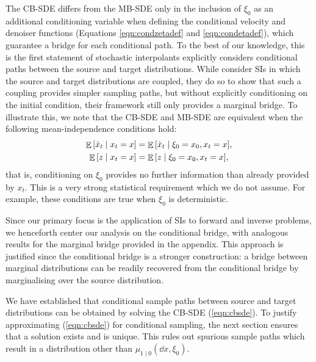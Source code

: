 The CB-SDE differs from the MB-SDE only in the inclusion of \(\xi_{0}\) as an additional conditioning variable when defining the conditional velocity and denoiser functions (Equations \ref{eqn:condzetadef} and \ref{eqn:condetadef}), which guarantee a bridge for each conditional path. To the best of our knowledge, this is the first statement of stochastic interpolants explicitly considers conditional paths between the source and target distributions. While \citet{albergo2023stochastic} consider SIs in which the source and target distributions are coupled, they do so to show that such a coupling provides simpler sampling paths, but without explicitly conditioning on the initial condition, their framework still only provides a marginal bridge. To illustrate this, we note that the CB-SDE and MB-SDE are equivalent when the following mean-independence conditions hold:
\begin{align*}
  \mathop{\mathbb{E}}\qty[\dot{x}_{t} \mid x_{t} = x] &= \mathop{\mathbb{E}}\qty[\dot{x}_{t} \mid \xi_{0} = x_{0}, x_{t} = x], \\
  \mathop{\mathbb{E}}\qty[z \mid x_{t} = x] &= \mathop{\mathbb{E}}\qty[z \mid \xi_{0} = x_{0}, x_{t} = x],
\end{align*}
that is, conditioning on \(\xi_{0}\) provides no further information than already provided by \(x_{t}\). This is a very strong statistical requirement which we do not assume. For example, these conditions are true when \(\xi_{0}\) is deterministic. %

Since our primary focus is the application of SIs to forward and inverse problems, we henceforth center our analysis on the conditional bridge, with analogous results for the marginal bridge provided in the appendix. This approach is justified since the conditional bridge is a stronger construction: a bridge between marginal distributions can be readily recovered from the conditional bridge by marginalising over the source distribution.

We have established that conditional sample paths between source and target distributions can be obtained by solving the CB-SDE (\ref{eqn:cbsde}). To justify approximating (\ref{eqn:cbsde}) for conditional sampling, the next section ensures that a solution exists and is unique. This rules out spurious sample paths which result in a distribution other than \(\mu_{1\mid 0}(\dd{x}, \xi_{0})\).

